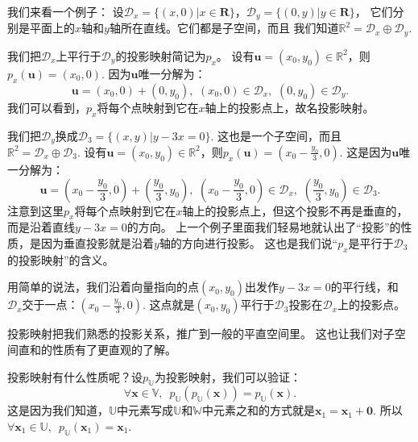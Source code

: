 \documentclass[12pt,UTF8]{ctexbook}
\begin{document}
我们来看一个例子：
设$\mathcal{D}_x = \{(x,0)|x\in\mathbf{R}\}$，$\mathcal{D}_y = \{(0,y)|y\in\mathbf{R}\}$，
它们分别是平面上的$x$轴和$y$轴所在直线。它们都是子空间，而且
我们知道$\mathbb{R}^2 = \mathcal{D}_x \oplus \mathcal{D}_y.$

我们把$\mathcal{D}_x$上平行于$\mathcal{D}_y$的投影映射简记为$p_x$。
设有$\mathbf{u} = (x_0, y_0) \in\mathbb{R}^2$，则$p_x(\mathbf{u}) = (x_0,0)$.
因为$\mathbf{u}$唯一分解为：
$$\mathbf{u} = (x_0,0) + (0,y_0), \,\,(x_0,0)\in\mathcal{D}_x,\,\,(0,y_0)\in\mathcal{D}_y.$$
我们可以看到，$p_x$将每个点映射到它在$x$轴上的投影点上，故名投影映射。

我们把$\mathcal{D}_y$换成$\mathcal{D}_{3} = \{(x, y) | y - 3x = 0\}.$
这也是一个子空间，而且$\mathbb{R}^2 = \mathcal{D}_x \oplus \mathcal{D}_3.$
设有$\mathbf{u} = (x_0, y_0) \in\mathbb{R}^2$，则$p_x(\mathbf{u}) = (x_0-\frac{y_0}{3},0)$.
这是因为$\mathbf{u}$唯一分解为：
$$\mathbf{u} = (x_0-\frac{y_0}{3},0) + (\frac{y_0}{3},y_0), \,\,(x_0-\frac{y_0}{3},0)\in\mathcal{D}_x,\,\,(\frac{y_0}{3},y_0)\in\mathcal{D}_3.$$
注意到这里$p_x$将每个点映射到它在$x$轴上的投影点上，但这个投影不再是垂直的，而是沿着直线$y - 3x = 0$的方向。
上一个例子里面我们轻易地就认出了“投影”的性质，是因为垂直投影就是沿着$y$轴的方向进行投影。
这也是我们说“$p_x$是平行于$\mathcal{D}_{3}$的投影映射”的含义。

用简单的说法，我们沿着向量指向的点$(x_0, y_0)$出发作$y - 3x = 0$的平行线，和$\mathcal{D}_x$交于一点：$(x_0-\frac{y_0}{3},0).$
这点就是$(x_0, y_0)$平行于$\mathcal{D}_3$投影在$\mathcal{D}_x$上的投影点。

投影映射把我们熟悉的投影关系，推广到一般的平直空间里。
这也让我们对子空间直和的性质有了更直观的了解。

投影映射有什么性质呢？设$p_{\mathbb{U}}$为投影映射，我们可以验证：
$$ \forall \mathbf{x} \in \mathbb{V},\,\,\,p_{\mathbb{U}}(p_{\mathbb{U}}(\mathbf{x})) = p_{\mathbb{U}}(\mathbf{x}).$$
这是因为我们知道，$\mathbb{U}$中元素写成$\mathbb{U}$和$\mathbb{W}$中元素之和的方式就是$\mathbf{x}_1 = \mathbf{x}_1 + \mathbf{0}.$
所以$\forall \mathbf{x}_1\in\mathbb{U},\,\,\, p_{\mathbb{U}}(\mathbf{x}_1) = \mathbf{x}_1.$
\end{document}
